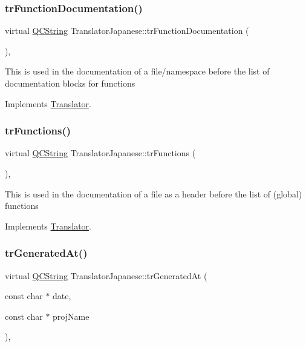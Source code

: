 \subsubsection{\texorpdfstring{trFunctionDocumentation()}{trFunctionDocumentation()}}
{\footnotesize\ttfamily virtual \mbox{\hyperlink{class_q_c_string}{Q\+C\+String}} Translator\+Japanese\+::tr\+Function\+Documentation (\begin{DoxyParamCaption}{ }\end{DoxyParamCaption})\hspace{0.3cm}{\ttfamily [inline]}, {\ttfamily [virtual]}}

This is used in the documentation of a file/namespace before the list of documentation blocks for functions 

Implements \mbox{\hyperlink{class_translator}{Translator}}.

\mbox{\label{class_translator_japanese_ae64726cd2c525bb4ae0898c0bab998f8}} 
\subsubsection{\texorpdfstring{trFunctions()}{trFunctions()}}
{\footnotesize\ttfamily virtual \mbox{\hyperlink{class_q_c_string}{Q\+C\+String}} Translator\+Japanese\+::tr\+Functions (\begin{DoxyParamCaption}{ }\end{DoxyParamCaption})\hspace{0.3cm}{\ttfamily [inline]}, {\ttfamily [virtual]}}

This is used in the documentation of a file as a header before the list of (global) functions 

Implements \mbox{\hyperlink{class_translator}{Translator}}.

\mbox{\label{class_translator_japanese_afe0d022e59f68b5cf2ad35faf6a863b4}} 
\subsubsection{\texorpdfstring{trGeneratedAt()}{trGeneratedAt()}}
{\footnotesize\ttfamily virtual \mbox{\hyperlink{class_q_c_string}{Q\+C\+String}} Translator\+Japanese\+::tr\+Generated\+At (\begin{DoxyParamCaption}\item[{const char $\ast$}]{date,  }\item[{const char $\ast$}]{proj\+Name }\end{DoxyParamCaption})\hspace{0.3cm}{\ttfamily [inline]}, {\ttfamily [virtual]}}


